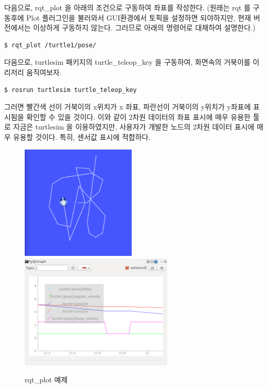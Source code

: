 다음으로, rqt\_plot 을 아래의 조건으로 구동하여 좌표를 작성한다. (원래는 rqt 를 구동후에 Plot 플러그인을 불러와서 GUI환경에서 토픽을 설정하면 되야하지만, 현재 버전에서는 이상하게 구동하지 않는다. 그러므로 아래의 명령어로 대채하여 설명한다.)

\begin{lstlisting}[language=ROS]
$ rqt_plot /turtle1/pose/
\end{lstlisting}

다음으로, turtlesim 패키지의 turtle\_teleop\_key 을 구동하여, 화면속의 거북이를 이리저리 움직여보자.

\begin{lstlisting}[language=ROS]
$ rosrun turtlesim turtle_teleop_key
\end{lstlisting}

그러면 빨간색 선이 거북이의 x위치가 x 좌표, 파란선이 거북이의 y위치가 y좌표에 표시됨을 확인할 수 있을 것이다. 이와 같이 2차원 데이터의 좌표 표시에 매우 유용한 툴로 지금은 turtlesim 을 이용하였지만, 사용자가 개발한 노드의 2차원 데이터 표시에 매우 유용할 것이다. 특히, 센서값 표시에 적합하다.

\begin{figure}[h]
\centering\includegraphics[height=55mm]{pictures/chapter6/turtlesim_rqt_plot1.png}
\centering\includegraphics[height=55mm]{pictures/chapter6/turtlesim_rqt_plot2.png}
\caption{rqt\_plot 예제}
\end{figure}

